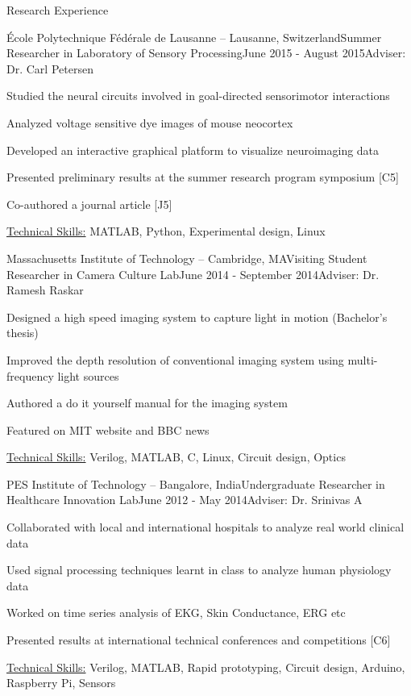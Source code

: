 \documentclass{resume}
\begin{document}
\begin{rSection}{Research Experience}
    \begin{rSubsection}{École Polytechnique Fédérale de Lausanne -- Lausanne, Switzerland}{}{Summer Researcher in Laboratory of Sensory Processing}{June 2015 - August 2015}{Adviser: Dr. Carl Petersen}
\item Studied the neural circuits involved in goal-directed sensorimotor interactions
\item Analyzed voltage sensitive dye images of mouse neocortex
\item Developed an interactive graphical platform to visualize neuroimaging data
\item Presented preliminary results at the summer research program symposium [C5]
\item Co-authored a journal article [J5]
\item \uline{Technical Skills:} MATLAB, Python, Experimental design, Linux
    \end{rSubsection}
    \begin{rSubsection}{Massachusetts Institute of Technology -- Cambridge, MA}{}{Visiting Student Researcher in Camera Culture Lab}{June 2014 - September 2014}{Adviser: Dr. Ramesh Raskar}
\item Designed a high speed imaging system to capture light in motion (Bachelor's thesis)
\item Improved the depth resolution of conventional imaging system using multi-frequency light sources
\item Authored a do it yourself manual for the imaging system
\item Featured on MIT website and BBC news
\item \uline{Technical Skills:} Verilog, MATLAB, C, Linux, Circuit design, Optics
    \end{rSubsection}
  \end{rSection}
 \begin{rSubsection}{PES Institute of Technology -- Bangalore, India}{}{Undergraduate Researcher in Healthcare Innovation Lab}{June 2012 - May 2014}{Adviser: Dr. Srinivas A}
\item Collaborated with local and international hospitals to analyze real world clinical data
\item Used signal processing techniques learnt in class to analyze human physiology data
\item Worked on time series analysis of EKG, Skin Conductance, ERG etc
\item Presented results at international technical conferences and competitions [C6]
\item \uline{Technical Skills:} Verilog, MATLAB, Rapid prototyping, Circuit design, Arduino, Raspberry Pi, Sensors
 \end{rSubsection}
\end{document}
